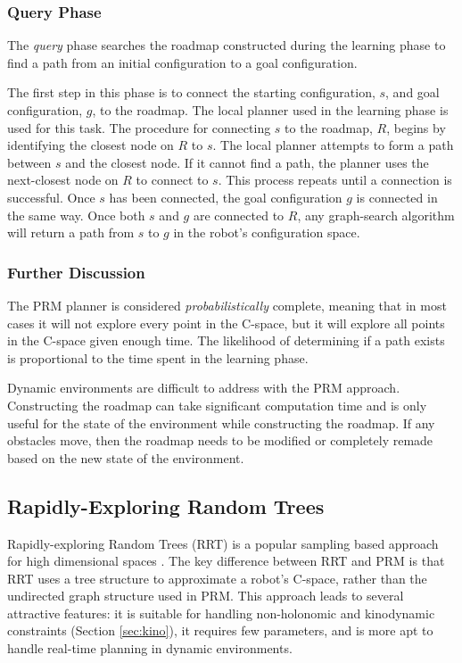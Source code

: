 \documentclass[10pt,conference]{ieeeconf}
\begin{document}
\subsubsection{Query Phase}

The \emph{query} phase searches the roadmap constructed during the learning phase to find a path from an initial configuration to a goal configuration. 

The first step in this phase is to connect the starting configuration, $s$, and goal configuration, $g$, to the roadmap. The local planner used in the learning phase is used for this task. The procedure for connecting $s$ to the roadmap, $R$, begins by identifying the closest node on $R$ to $s$. The local planner attempts to form a path between $s$ and the closest node. If it cannot find a path, the planner uses the next-closest node on $R$ to connect to $s$. This process repeats until a connection is successful. Once $s$ has been connected, the goal configuration $g$ is connected in the same way. Once both $s$ and $g$ are connected to $R$, any graph-search algorithm will return a path from $s$ to $g$ in the robot's configuration space.

\subsubsection{Further Discussion}

The PRM planner is considered \emph{probabilistically} complete, meaning that in most cases it will not explore every point in the C-space, but it will explore all points in the C-space given enough time. The likelihood of determining if a path exists is proportional to the time spent in the learning phase. 

Dynamic environments are difficult to address with the PRM approach. Constructing the roadmap can take significant computation time and is only useful for the state of the environment while constructing the roadmap. If any obstacles move, then the roadmap needs to be modified or completely remade based on the new state of the environment.


\subsection{Rapidly-Exploring Random Trees}

Rapidly-exploring Random Trees (RRT) is a popular sampling based approach for high dimensional spaces \cite{RRT}. The key difference between RRT and PRM is that RRT uses a tree structure to approximate a robot's C-space, rather than the undirected graph structure used in PRM. This approach leads to several attractive features: it is suitable for handling non-holonomic and kinodynamic constraints (Section \ref{sec:kino}), it requires few parameters, and is more apt to handle real-time planning in dynamic environments. 
\end{document}
